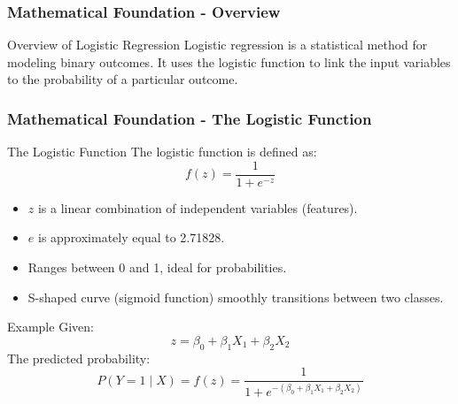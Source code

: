 \documentclass[aspectratio=169]{beamer}
\begin{document}
\begin{frame}[fragile]
    \frametitle{Mathematical Foundation - Overview}
    \begin{block}{Overview of Logistic Regression}
        Logistic regression is a statistical method for modeling binary outcomes. It uses the logistic function to link the input variables to the probability of a particular outcome.
    \end{block}
\end{frame}

\begin{frame}[fragile]
    \frametitle{Mathematical Foundation - The Logistic Function}
    \begin{block}{The Logistic Function}
        The logistic function is defined as:
        \[
        f(z) = \frac{1}{1 + e^{-z}}
        \]
        \begin{itemize}
            \item \( z \) is a linear combination of independent variables (features).
            \item \( e \) is approximately equal to 2.71828.
        \end{itemize}
        \begin{itemize}
            \item Ranges between 0 and 1, ideal for probabilities.
            \item S-shaped curve (sigmoid function) smoothly transitions between two classes.
        \end{itemize}
    \end{block}
    \begin{block}{Example}
        Given: 
        \[
        z = \beta_0 + \beta_1X_1 + \beta_2X_2
        \]
        The predicted probability:
        \[
        P(Y=1 \mid X) = f(z) = \frac{1}{1 + e^{-(\beta_0 + \beta_1X_1 + \beta_2X_2)}}
        \]
    \end{block}
\end{frame}
\end{document}
